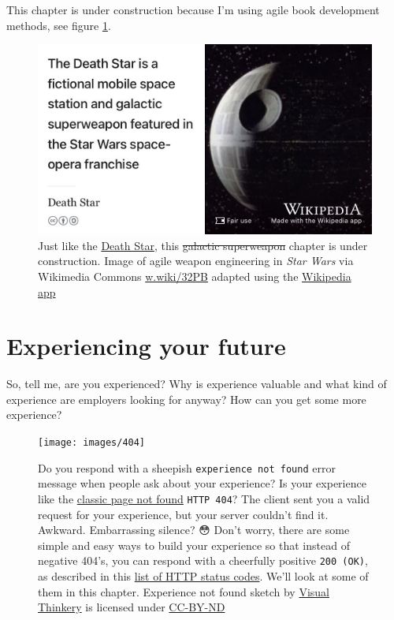 \documentclass[
]{book}
\begin{document}
This chapter is under construction because I'm using agile book development methods, see figure \ref{fig:deathstar-fig}.

\begin{figure}

{\centering \includegraphics[width=0.99\linewidth]{images/DeathStar2} 

}

\caption{Just like the \href{https://en.wikipedia.org/wiki/Death_Star}{Death Star}, this \sout{galactic superweapon} chapter is under construction. Image of agile weapon engineering in \emph{Star Wars} via Wikimedia Commons \href{https://w.wiki/32PB}{w.wiki/32PB} adapted using the \href{https://apps.apple.com/gb/app/wikipedia/id324715238}{Wikipedia app}}\label{fig:deathstar-fig}
\end{figure}



\hypertarget{experiencing}{%
\chapter{Experiencing your future}\label{experiencing}}

So, tell me, are you experienced? Why is experience valuable and what kind of experience are employers looking for anyway? How can you get some more experience? 🤔

\begin{figure}

{\centering \texttt{[image: images/404]} 

}

\caption{Do you respond with a sheepish \texttt{experience\ not\ found} error message when people ask about your experience? Is your experience like the \href{https://en.wikipedia.org/wiki/HTTP_404}{classic page not found} \texttt{HTTP\ 404}? The client sent you a valid request for your experience, but your server couldn't find it. Awkward. Embarrassing silence? 😳 Don't worry, there are some simple and easy ways to build your experience so that instead of negative 404's, you can respond with a cheerfully positive \texttt{200\ (OK)}, as described in this \href{https://en.wikipedia.org/wiki/List_of_HTTP_status_codes}{list of HTTP status codes}. We'll look at some of them in this chapter. Experience not found sketch by \href{https://visualthinkery.com/}{Visual Thinkery} is licensed under \href{https://creativecommons.org/licenses/by-nd/4.0/}{CC-BY-ND}}\label{fig:404-fig}
\end{figure}
\end{document}
